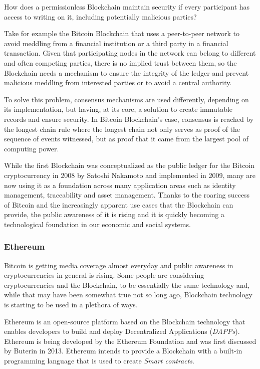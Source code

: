 How does a permissionless Blockchain maintain security if every participant has
access to writing on it, including potentially malicious parties?

Take for example the Bitcoin Blockchain that uses a peer-to-peer network to
avoid meddling from a financial institution or a third party in a financial
transaction. Given that participating nodes in the network can belong to
different and often competing parties, there is no implied trust between them,
so the Blockchain needs a mechanism to ensure the integrity of the ledger and
prevent malicious meddling from interested parties or to avoid a central
authority.\cite{Barclay2017}

To solve this problem, consensus mechanisms are used differently, depending on
its implementation, but having, at its core, a solution to create immutable
records and ensure security.  In Bitcoin Blockchain’s case, consensus is
reached by the longest chain rule where the longest chain not only serves as
proof of the sequence of events witnessed, but as proof that it came from the
largest pool of computing power.\cite{Baars2016}

While the first Blockchain was conceptualized as the public ledger for the
Bitcoin cryptocurrency in 2008 by Satoshi Nakamoto and implemented in 2009,
many are now using it as a foundation across many application areas such as
identity management, traceability and asset management.  Thanks to the roaring
success of Bitcoin and the increasingly apparent use cases that the Blockchain
can provide, the public awareness of it is rising and it is quickly becoming a
technological foundation in our economic and social systems.

\subsubsection{Ethereum}

Bitcoin is getting media coverage almost everyday and public awareness in
cryptocurrencies in general is rising.  Some people are considering
cryptocurrencies and the Blockchain, to be essentially the same technology and,
while that may have been somewhat true not so long ago, Blockchain technology
is starting to be used in a plethora of ways.

Ethereum is an open-source platform based on the Blockchain technology that
enables developers to build and deploy Decentralized Applications
(\textit{DAPPs}).  Ethereum is being developed by the Ethereum Foundation and
was first discussed by Buterin in 2013.  Ethereum intends to provide a
Blockchain with a built-in programming language that is used to create
\textit{Smart contracts}.  \cite{Wood2017}

